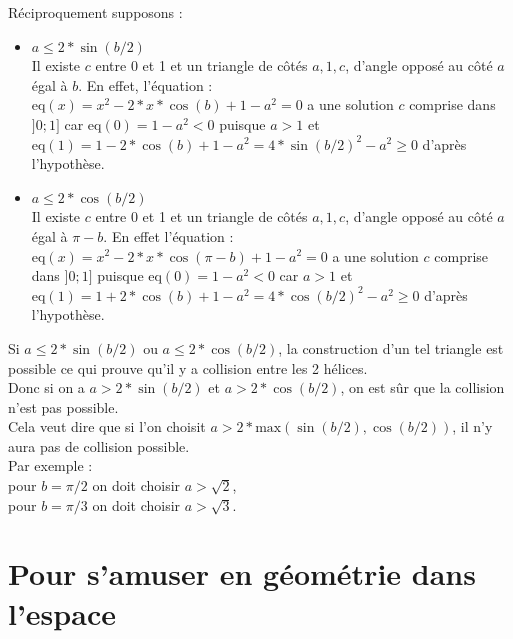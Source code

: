 \documentclass[a4paper,11pt]{book}
\begin{document}
R\'eciproquement supposons :
\begin{itemize}
\item $a\leq 2*\sin(b/2)$\\
Il existe $c$ entre 0 et 1 et un triangle de c\^ot\'es $a,1,c$, d'angle 
oppos\'e au c\^ot\'e $a$ \'egal \`a $b$. 
En effet, l'\'equation :\\
eq$(x)=x^2-2*x*\cos(b)+1-a^2=0$ a une solution $c$ comprise dans $]0;1]$ car
eq$(0)=1-a^2<0$ puisque $a>1$ et \\
eq$(1)=1-2*\cos(b)+1-a^2=4*\sin(b/2)^2-a^2 \geq 0$
d'apr\`es l'hypoth\`ese. 
\item $a\leq 2*\cos(b/2)$\\
Il existe $c$ entre 0 et 1 et un triangle de c\^ot\'es $a,1,c$, d'angle 
oppos\'e au c\^ot\'e $a$ \'egal \`a $\pi-b$.
En effet l'\'equation :\\
eq$(x)=x^2-2*x*\cos(\pi-b)+1-a^2=0$ a une solution $c$ comprise dans $]0;1]$ 
puisque  eq$(0)=1-a^2<0$ car $a>1$ et\\ 
eq$(1)=1+2*\cos(b)+1-a^2=4*\cos(b/2)^2-a^2 \geq 0$ d'apr\`es l'hypoth\`ese. 
\end{itemize}
Si $a\leq 2*\sin(b/2)$ ou $a\leq 2*\cos(b/2)$, la construction  d'un tel 
triangle est possible ce qui prouve qu'il y a 
collision entre les 2 h\'elices.\\ 
Donc si on a  $a>2*\sin(b/2)$ et $a>2*\cos(b/2)$, on est s\^ur que la 
collision n'est pas possible.\\
Cela veut dire que si l'on choisit $a>2*\mbox{max}(\sin(b/2),\cos(b/2))$, il 
n'y aura pas de collision possible.\\
Par exemple :\\
pour $b=\pi/2$ on doit choisir $a>\sqrt 2$,\\
pour $b=\pi/3$ on doit choisir $a>\sqrt 3$.\\
\chapter{Pour s'amuser en g\'eom\'etrie dans l'espace}
\end{document}
